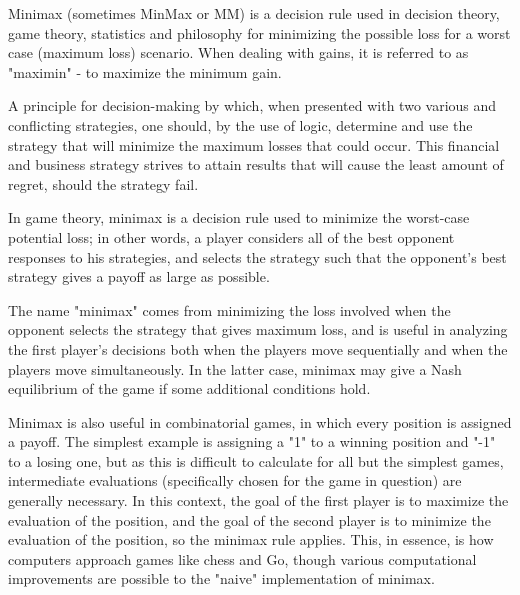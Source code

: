 Minimax (sometimes MinMax or MM) is a decision rule used in decision theory, game theory, statistics and philosophy for minimizing the possible loss for a worst case (maximum loss) scenario. When dealing with gains, it is referred to as "maximin" - to maximize the minimum gain.

A principle for decision-making by which, when presented with two various and conflicting strategies, one should, by the use of logic, determine and use the strategy that will minimize the maximum losses that could occur. This financial and business strategy strives to attain results that will cause the least amount of regret, should the strategy fail.






In game theory, minimax is a decision rule used to minimize the worst-case potential loss; in other words, a player considers all of the best opponent responses to his strategies, and selects the strategy such that the opponent's best strategy gives a payoff as large as possible.

The name "minimax" comes from minimizing the loss involved when the opponent selects the strategy that gives maximum loss, and is useful in analyzing the first player's decisions both when the players move sequentially and when the players move simultaneously. In the latter case, minimax may give a Nash equilibrium of the game if some additional conditions hold.

Minimax is also useful in combinatorial games, in which every position is assigned a payoff. The simplest example is assigning a "1" to a winning position and "-1" to a losing one, but as this is difficult to calculate for all but the simplest games, intermediate evaluations (specifically chosen for the game in question) are generally necessary. In this context, the goal of the first player is to maximize the evaluation of the position, and the goal of the second player is to minimize the evaluation of the position, so the minimax rule applies. This, in essence, is how computers approach games like chess and Go, though various computational improvements are possible to the "naive" implementation of minimax.

